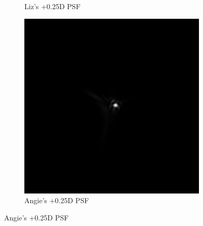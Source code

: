 \documentclass{article}
\begin{document}
\begin{figure}[H]
\begin{subfigure}{.3\textwidth}
  \caption{Liz's +0.25D PSF}
  \label{fig:liz025dpsf}
\end{subfigure}
\begin{subfigure}{.3\textwidth}
  \centering
  \includegraphics[width=1\linewidth]{Angie_R_0526_1_500_zer_025_5_PSF.png}
  \caption{Angie's +0.25D PSF}
  \label{fig:angie025dpsf}
\end{subfigure}

\medskip


\end{figure}
\end{document}
